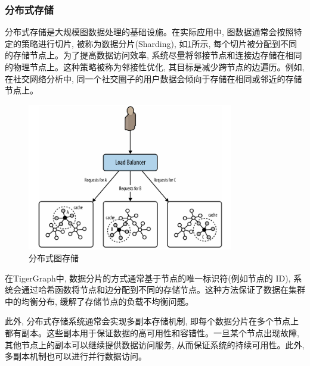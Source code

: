 \subsubsection{分布式存储}
分布式存储是大规模图数据处理的基础设施。在实际应用中, 图数据通常会按照特定的策略进行切片, 被称为数据分片(Sharding), 如\cref{fig:sharding}所示, 每个切片被分配到不同的存储节点上。为了提高数据访问效率, 系统尽量将邻接节点和连接边存储在相同的物理节点上。这种策略被称为邻接性优化, 其目标是减少跨节点的边遍历。例如, 在社交网络分析中, 同一个社交圈子的用户数据会倾向于存储在相同或邻近的存储节点上。
\begin{figure}
	\centering
	\includegraphics[width=0.8\textwidth]{images/26.png}
	\caption{分布式图存储}
	\label{fig:sharding}
\end{figure}

在TigerGraph中, 数据分片的方式通常基于节点的唯一标识符(例如节点的 ID), 系统会通过哈希函数将节点和边分配到不同的存储节点。这种方法保证了数据在集群中的均衡分布, 缓解了存储节点的负载不均衡问题。

此外, 分布式存储系统通常会实现多副本存储机制, 即每个数据分片在多个节点上都有副本。这些副本用于保证数据的高可用性和容错性。一旦某个节点出现故障, 其他节点上的副本可以继续提供数据访问服务, 从而保证系统的持续可用性。此外, 多副本机制也可以进行并行数据访问。

